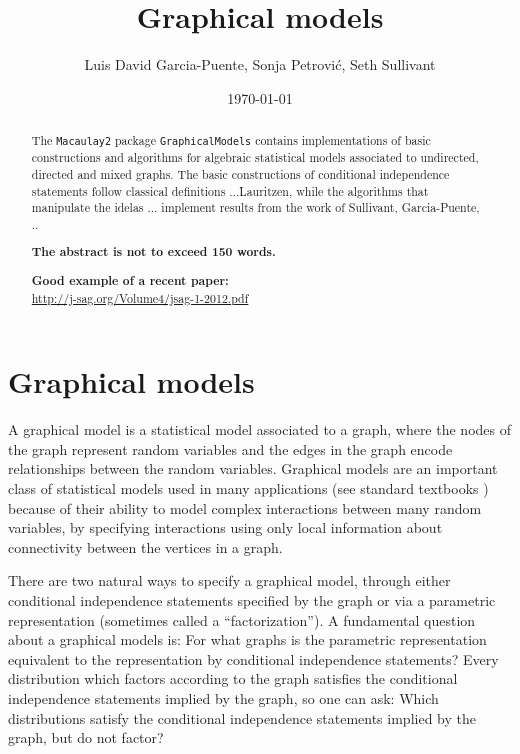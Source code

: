 \documentclass[letterpaper]{article}
\title{Graphical models}
\author{Luis David Garcia-Puente, Sonja Petrovi\'c, Seth Sullivant}
\date{\today}
\theoremstyle{definition}
\begin{document}
\maketitle
\begin{abstract}
The {\tt Macaulay2} package {\tt GraphicalModels} contains implementations of basic constructions and algorithms for algebraic statistical models associated to undirected, directed and mixed graphs. 
The basic constructions of conditional independence statements follow classical definitions ...Lauritzen, while the algorithms that manipulate the idelas ... implement results from the work of Sullivant, Garcia-Puente, .. 

{\bf The abstract is not to exceed 150 words.}

{\bf Good example of a recent paper:}\\ \url{http://j-sag.org/Volume4/jsag-1-2012.pdf}
\end{abstract}


\section{Graphical models}
A graphical model is a statistical model associated to a graph,
where the nodes of the graph represent random variables and the
edges in the graph encode relationships between the random variables.
Graphical models are an important class of statistical models used
in many applications (see standard textbooks \cite{Lauritzen, Whitaker})
because of their ability to model complex interactions between
many random variables, by specifying
interactions using only local information about connectivity
between the vertices in a graph.

There are two natural ways to specify a graphical model, through 
either conditional independence statements specified by the graph
or via a parametric representation (sometimes called a ``factorization'').
A fundamental question about a graphical models is: For what
graphs is the parametric representation equivalent to the
representation by conditional independence statements?
Every distribution which factors according to the graph
satisfies the conditional independence statements implied by the 
graph, so one can ask:  Which distributions satisfy the conditional
independence statements implied by the graph, but do not factor?
\end{document}
